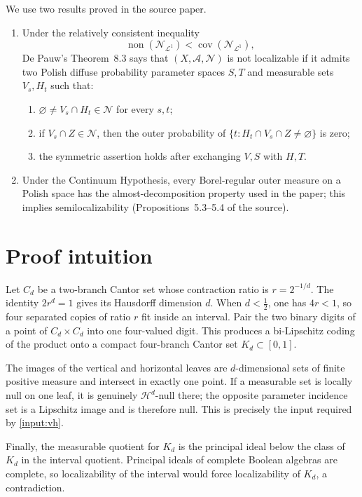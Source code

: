 \documentclass[11pt]{article}
\newcommand{\A}{\mathcal{A}}
\newcommand{\N}{\mathcal{N}}
\newcommand{\Hh}{\mathcal{H}}
\begin{document}
We use two results proved in the source paper.

\begin{enumerate}[label=\textup{(D\arabic*)}]
\item\label{input:vh}
Under the relatively consistent inequality
\[
 \operatorname{non}(\N_{\mathcal L^1})
 <\operatorname{cov}(\N_{\mathcal L^1}),
\]
De Pauw's Theorem~8.3 says that $(X,\A,\N)$ is not localizable if it
admits two Polish diffuse probability parameter spaces $S,T$ and measurable
sets $V_s,H_t$ such that:
\begin{enumerate}[label=\textup{(\alph*)}]
\item $\varnothing\ne V_s\cap H_t\in\N$ for every $s,t$;
\item if $V_s\cap Z\in\N$, then the outer probability of
$\{t:H_t\cap V_s\cap Z\ne\varnothing\}$ is zero;
\item the symmetric assertion holds after exchanging $V,S$ with $H,T$.
\end{enumerate}
\item\label{input:ch}
Under the Continuum Hypothesis, every Borel-regular outer measure on a
Polish space has the almost-decomposition property used in the paper; this
implies semilocalizability (Propositions~5.3--5.4 of the source).
\end{enumerate}

\section*{Proof intuition}

Let $C_d$ be a two-branch Cantor set whose contraction ratio is
$r=2^{-1/d}$.  The identity $2r^d=1$ gives its Hausdorff dimension $d$.
When $d<\frac12$, one has $4r<1$, so four separated copies of ratio $r$
fit inside an interval.  Pair the two binary digits of a point of
$C_d\times C_d$ into one four-valued digit.  This produces a bi-Lipschitz
coding of the product onto a compact four-branch Cantor set $K_d\subset[0,1]$.

The images of the vertical and horizontal leaves are $d$-dimensional sets of
finite positive measure and intersect in exactly one point.  If a measurable
set is locally null on one leaf, it is genuinely $\Hh^d$-null there; the
opposite parameter incidence set is a Lipschitz image and is therefore null.
This is precisely the input required by \ref{input:vh}.

Finally, the measurable quotient for $K_d$ is the principal ideal below the
class of $K_d$ in the interval quotient.  Principal ideals of complete
Boolean algebras are complete, so localizability of the interval would force
localizability of $K_d$, a contradiction.
\end{document}

